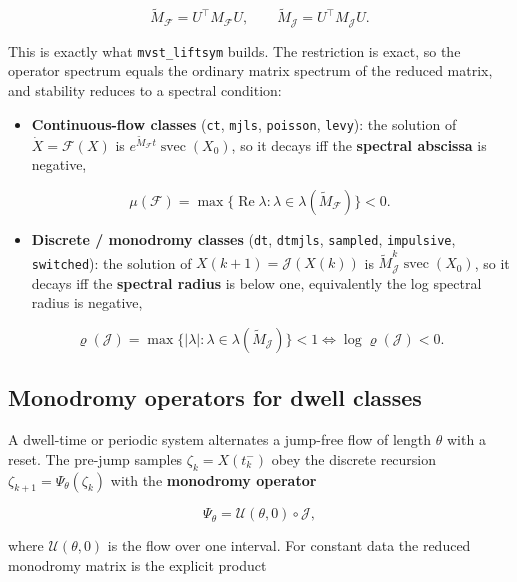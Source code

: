 \documentclass[11pt,oneside]{report}
\newcommand{\code}[1]{\texttt{#1}}
\providecommand{\tightlist}{\setlength{\itemsep}{0pt}\setlength{\parskip}{0pt}}
\begin{document}
\[\widetilde M_{\mathcal{F}}=U^{\top}M_{\mathcal{F}}U,\qquad \widetilde M_{\mathcal{J}}=U^{\top}M_{\mathcal{J}}U.\]

This is exactly what \code{mvst\_liftsym} builds. The restriction is exact, so the
operator spectrum equals the ordinary matrix spectrum of the reduced matrix, and
stability reduces to a spectral condition:

\begin{itemize}
\tightlist
\item
  \textbf{Continuous-flow classes} (\code{ct}, \code{mjls}, \code{poisson}, \code{levy}): the solution of
  \(\dot X=\mathcal{F}(X)\) is \(e^{\widetilde M_{\mathcal{F}}t}\operatorname{svec}(X_0)\),
  so it decays iff the \textbf{spectral abscissa} is negative,
\end{itemize}

\[\mu(\mathcal{F})=\max\{\operatorname{Re}\lambda:\lambda\in\lambda(\widetilde M_{\mathcal{F}})\}<0.\]

\begin{itemize}
\tightlist
\item
  \textbf{Discrete / monodromy classes} (\code{dt}, \code{dtmjls}, \code{sampled}, \code{impulsive},
  \code{switched}): the solution of \(X(k{+}1)=\mathcal{J}(X(k))\) is
  \(\widetilde M_{\mathcal{J}}^{ k}\operatorname{svec}(X_0)\), so it decays iff the
  \textbf{spectral radius} is below one, equivalently the log spectral radius is
  negative,
\end{itemize}

\[\varrho(\mathcal{J})=\max\{|\lambda|:\lambda\in\lambda(\widetilde M_{\mathcal{J}})\}<1\iff\log\varrho(\mathcal{J})<0.\]

\hypertarget{monodromy-operators-for-dwell-classes}{%
\subsection{Monodromy operators for dwell classes}\label{monodromy-operators-for-dwell-classes}}

A dwell-time or periodic system alternates a jump-free flow of length \(\theta\)
with a reset. The pre-jump samples \(\zeta_k=X(t_k^{-})\) obey the discrete
recursion \(\zeta_{k+1}=\Psi_\theta(\zeta_k)\) with the \textbf{monodromy operator}

\[\Psi_\theta=\mathcal{U}(\theta,0)\circ\mathcal{J},\]

where \(\mathcal{U}(\theta,0)\) is the flow over one interval. For constant data the
reduced monodromy matrix is the explicit product
\end{document}
